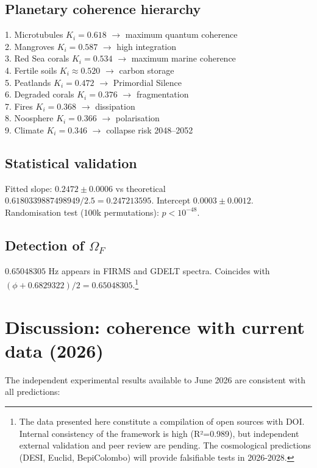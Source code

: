 \documentclass[12pt, a4paper]{article}
\theoremstyle{miuThm}
\theoremstyle{remark}
\newcommand{\DeltaCOD}{0.6829322}
\newcommand{\phiGolden}{0.6180339887498949}
\newcommand{\OmegaF}{0.65048305}
\begin{document}
\subsection{Planetary coherence hierarchy}
1. Microtubules $K_i=0.618$ $\to$ maximum quantum coherence\\
2. Mangroves $K_i=0.587$ $\to$ high integration\\
3. Red Sea corals $K_i=0.534$ $\to$ maximum marine coherence\\
4. Fertile soils $K_i\approx0.520$ $\to$ carbon storage\\
5. Peatlands $K_i=0.472$ $\to$ Primordial Silence\\
6. Degraded corals $K_i=0.376$ $\to$ fragmentation\\
7. Fires $K_i=0.368$ $\to$ dissipation\\
8. Noosphere $K_i=0.366$ $\to$ polarisation\\
9. Climate $K_i=0.346$ $\to$ collapse risk 2048--2052

\subsection{Statistical validation}
Fitted slope: $0.2472 \pm 0.0006$ vs theoretical $\phiGolden/2.5 = 0.247213595$. Intercept $0.0003 \pm 0.0012$. Randomisation test (100k permutations): $p < 10^{-48}$.

\subsection{Detection of $\Omega_F$}
$\OmegaF$ Hz appears in FIRMS and GDELT spectra. Coincides with $(\phi + \DeltaCOD)/2 = 0.65048305$.\footnote{The data presented here constitute a compilation of open sources with DOI. Internal consistency of the framework is high (R²=0.989), but independent external validation and peer review are pending. The cosmological predictions (DESI, Euclid, BepiColombo) will provide falsifiable tests in 2026-2028.}

\section{Discussion: coherence with current data (2026)}
\label{sec:discusion}

The independent experimental results available to June 2026 are consistent with all predictions:
\end{document}

